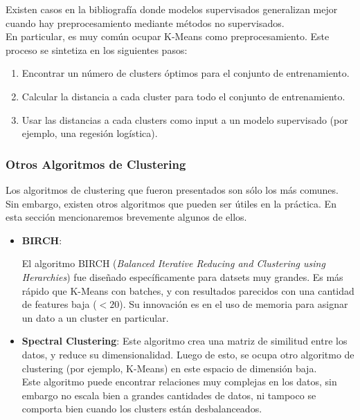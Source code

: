 Existen casos en la bibliografía donde modelos supervisados generalizan mejor cuando hay preprocesamiento mediante métodos no supervisados. \\

En particular, es muy común ocupar K-Means como preprocesamiento. Este proceso se sintetiza en los siguientes pasos: 

\begin{enumerate}
    \item Encontrar un número de clusters óptimos para el conjunto de entrenamiento.
    \item Calcular la distancia a cada cluster para todo el conjunto de entrenamiento. 
    \item Usar las distancias a cada clusters como input a un modelo supervisado (por ejemplo, una regesión logística). 
\end{enumerate}

\subsubsection{Otros Algoritmos de Clustering}

Los algoritmos de clustering que fueron presentados son sólo los más comunes. Sin embargo, existen otros algoritmos que pueden ser útiles en la práctica. En esta sección mencionaremos brevemente algunos de ellos. 

\begin{itemize}
    \item \textbf{BIRCH}: 
    
    El algoritmo BIRCH  (\textit{Balanced Iterative Reducing and Clustering using Herarchies}) fue diseñado específicamente para datsets muy grandes. Es más rápido que K-Means con batches, y con resultados parecidos con una cantidad de features baja ($< 20$). Su innovación es en el uso de memoria para asignar un dato a un cluster en particular.
    \item \textbf{Spectral Clustering}:
    Este algoritmo crea una matriz de similitud entre los datos, y reduce su dimensionalidad. Luego de esto, se ocupa otro algoritmo de clustering (por ejemplo, K-Means) en este espacio de dimensión baja. \\
    
    Este algoritmo puede encontrar relaciones muy complejas en los datos, sin embargo no escala bien a grandes cantidades de datos, ni tampoco se comporta bien cuando los clusters están desbalanceados. 
\end{itemize}
